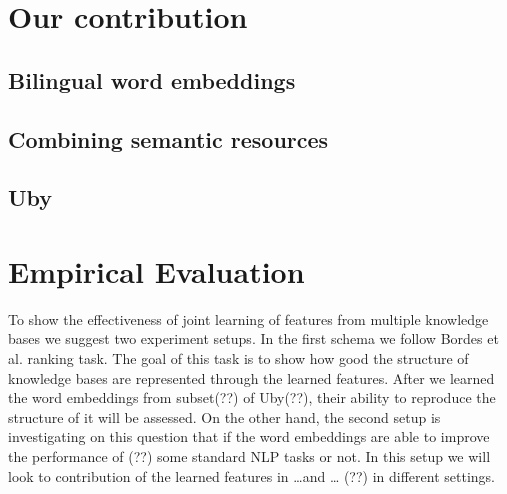 \documentclass[preprint,12pt]{elsarticle}
\begin{document}
\section {Our contribution}
\label{sec:contr}

\subsection{Bilingual word embeddings}
\label{contr:bilingual}

\subsection{Combining semantic resources}
\label{contr:combine}

\subsection{Uby}
\label{contr:uby}

\section{Empirical Evaluation}
\label{sec:exp}
To show the effectiveness of joint learning of features from multiple knowledge bases we suggest 
two experiment setups. In the first schema we follow Bordes et al. ranking task. The goal of this task is
to show how good the structure of knowledge bases are represented through the learned features. 
After we learned the word embeddings from subset(??) of Uby(??),
 their ability to reproduce the structure of it will be assessed. On the other hand, the second
  setup is investigating on this question that if the word embeddings are able to improve the performance of (??)
   some standard NLP tasks or not. In this setup we will look to contribution of the learned features in \ldots and \ldots
    (??) in different settings.
\end{document}
